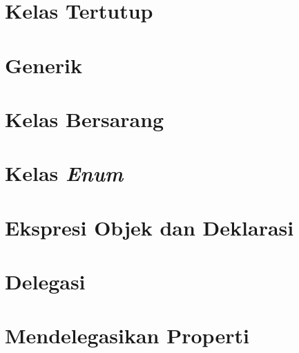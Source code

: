 \section{Kelas Tertutup}

\section{Generik}

\section{Kelas Bersarang}

\section{Kelas \textit{Enum}}

\section{Ekspresi Objek dan Deklarasi}

\section{Delegasi}

\section{Mendelegasikan Properti}